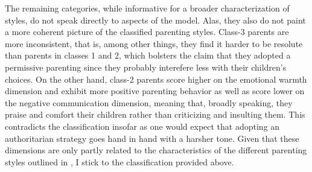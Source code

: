 The remaining categories, while informative for a broader characterization of styles, do not speak directly to aspects of the model. Alas, they also do not paint a more coherent picture of the classified parenting styles. Class-3 parents are more inconsistent, that is, among other things, they find it harder to be resolute than parents in classes 1 and 2, which bolsters the claim that they adopted a permissive parenting since they probably interefere less with their children's choices. On the other hand, class-2 parents score higher on the emotional warmth dimension and exhibit more positive parenting behavior as well as score lower on the negative communication dimension, meaning that, broadly speaking, they praise and comfort their children rather than criticizing and insulting them. This contradicts the classification insofar as one would expect that adopting an authoritarian strategy goes hand in hand with a harsher tone. Given that these dimensions are only partly related to the characteristics of the different parenting styles outlined in \textcite{doepkeEconomicsParenting2019}, I stick to the classification provided above.